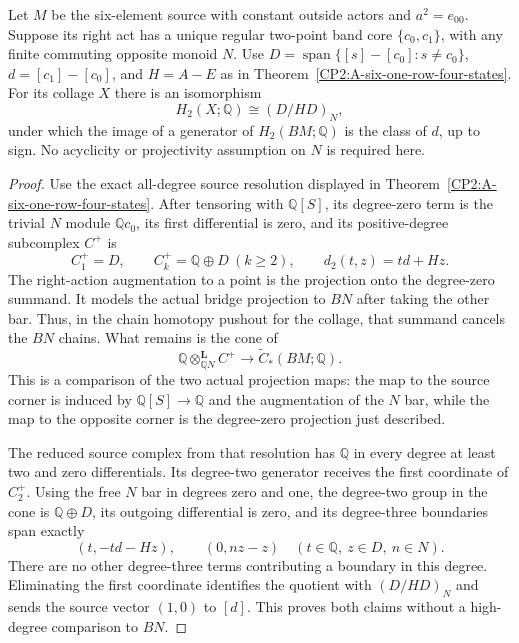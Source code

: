 \begin{lemma}
\label{CP2:A-six-nilpotent-low-degree-any-opposite}
Let $M$ be the six-element source with constant outside
actors and $a^2=e_{00}$. Suppose its right act has a
unique regular two-point band core $\{c_0,c_1\}$, with
any finite commuting opposite monoid $N$. Use
$D=\operatorname{span}\{[s]-[c_0]:s\ne c_0\}$,
$d=[c_1]-[c_0]$, and $H=A-E$ as in
Theorem~\ref{CP2:A-six-one-row-four-states}.
For its collage $X$ there is an isomorphism
\[
 H_2(X;\mathbb Q)\cong(D/HD)_N,
\]
under which the image of a generator of $H_2(BM;\mathbb Q)$
is the class of $d$, up to sign. No acyclicity or
projectivity assumption on $N$ is required here.
\end{lemma}
\begin{proof}
Use the exact all-degree source resolution displayed in
Theorem~\ref{CP2:A-six-one-row-four-states}. After tensoring
with $\mathbb Q[S]$, its degree-zero term is the trivial
$N$ module $\mathbb Qc_0$, its first differential is zero,
and its positive-degree subcomplex $C^+$ is
\[
 C^+_1=D,\qquad C^+_k=\mathbb Q\oplus D\ (k\ge2),
 \qquad d_2(t,z)=td+Hz.
\]
The right-action augmentation to a point is the projection
onto the degree-zero summand. It models the actual bridge
projection to $BN$ after taking the other bar. Thus, in
the chain homotopy pushout for the collage, that summand
cancels the $BN$ chains. What remains is the cone of
\[
 \mathbb Q\otimes_{\mathbb QN}^{\mathbf L}C^+
 \longrightarrow \widetilde C_*(BM;\mathbb Q).
\]
This is a comparison of the two actual projection maps:
the map to the source corner is induced by
$\mathbb Q[S]\to\mathbb Q$ and the augmentation of the
$N$ bar, while the map to the opposite corner is the
degree-zero projection just described.

The reduced source complex from that resolution has
$\mathbb Q$ in every degree at least two and zero
differentials. Its degree-two generator receives the
first coordinate of $C^+_2$. Using the free $N$ bar in
degrees zero and one, the degree-two group in the cone
is $\mathbb Q\oplus D$, its outgoing differential is zero,
and its degree-three boundaries span exactly
\[
 (t,-td-Hz),\qquad (0,nz-z)
 \quad(t\in\mathbb Q,\ z\in D,\ n\in N).
\]
There are no other degree-three terms contributing a
boundary in this degree. Eliminating the first coordinate
identifies the quotient with $(D/HD)_N$ and sends the
source vector $(1,0)$ to $[d]$. This proves both claims
without a high-degree comparison to $BN$.
\end{proof}

